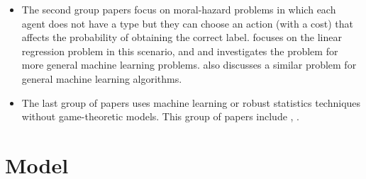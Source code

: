 \documentclass{article}
\begin{document}
\begin{itemize}
\item The second group papers focus on moral-hazard problems in which each agent does not have a type but they can choose an action (with a cost) that affects the probability of obtaining the correct label. \citet*{richardsonprivately} focuses on the linear regression problem in this scenario, and \citet*{cai2015optimum} and \citet*{shah2016double} investigates the problem for more general machine learning problems. \citet*{mihailescu2010strategy} also discusses a similar problem for general machine learning algorithms.
\item The last group of papers uses machine learning or robust statistics techniques without game-theoretic models. This group of papers include \citet*{dekel2009vox}, \citet*{dekel2009good}.
\end{itemize}



\section{Model} 
\end{document}
